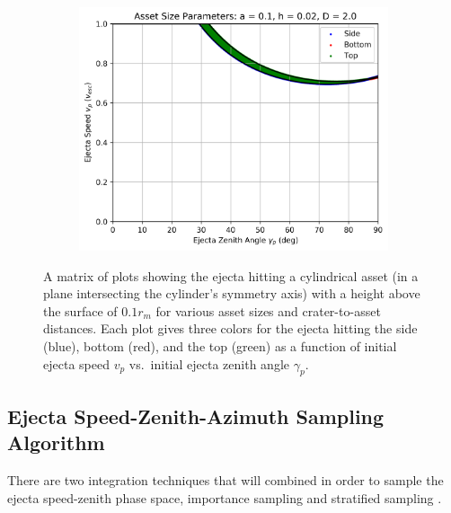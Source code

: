 \documentclass{article}
\begin{document}
\begin{figure}
	\begin{subfigure}[t]{.32\textwidth}
		\centering
		\includegraphics[width=.98\linewidth]{asset_speed_zenith_plot_1.100e+00_1.000e-01_2.000e-02_2.000e+00.png}  
		\label{fig:sub-asset_speed_zenith_h2_12}
	\end{subfigure}
	
	\caption{A matrix of plots showing the ejecta hitting a cylindrical asset (in a plane intersecting the cylinder's symmetry axis) with a height above the surface of $0.1 r_m$ for various asset sizes and crater-to-asset distances. Each plot gives three colors for the ejecta hitting the side (blue), bottom (red), and the top (green) as a function of initial ejecta speed $v_p$ vs.\ initial ejecta zenith angle $\gamma_p$.}
	\label{fig:asset_speed_zenith_comparison_h2}
\end{figure}

\clearpage

\subsection{Ejecta Speed-Zenith-Azimuth Sampling Algorithm}\label{ssec:Ejecta Speed-Zenith-Azimuth Sampling Algorithm}
There are two integration techniques that will combined in order to sample the ejecta speed-zenith phase space, importance sampling \citep[e.g., Section 9.7 of][]{kroese2013handbook} and stratified sampling \citep[e.g., Section 9.5 of][]{kroese2013handbook}.
\end{document}

